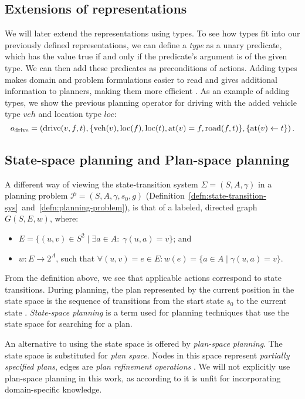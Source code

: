 \subsection{Extensions of representations}

We will later extend the representations using types.
To see how types fit into our previously defined representations, we can
define a \textit{type} as a unary predicate, which has the value true
if and only if the predicate's argument is of the given type.
We can then add these predicates as preconditions of actions.
Adding types makes domain and problem formulations
easier to read and gives additional information
to planners, making them more efficient \citep[Section 2.4.1]{Ghallab2004}. As an example of adding types, we show the previous planning operator for driving with the added vehicle type $veh$ and location type $loc$:
$$o_{\textrm{drive}} = \left(\textrm{drive}(v, f, t), \{\textrm{veh}(v), \textrm{loc}(f), \textrm{loc}(t), \textrm{at}(v) = f, \textrm{road}(f, t)\}, \{\textrm{at}(v) \leftarrow t\}\right).$$

\subsection{State-space planning and Plan-space planning}

A different way of viewing the state-transition system $\Sigma = (S, A, \gamma)$ in a
planning problem $\mathcal{P} = (S, A, \gamma, s_0, g)$ (Definition~\ref{defn:state-transition-sys}~and~\ref{defn:planning-problem}), is that of a labeled, directed graph $G(S, E, w)$, where:
\begin{itemize}
\item $E = \{(u, v) \in S^2 \;|\; \exists a \in A : \; \gamma(u, a) = v\}$; and
\item $w: E \to 2^A$, such that $\forall (u, v) = e \in E : w(e) = \{a \in A \;|\; \gamma(u, a) = v\}$. 
\end{itemize}
From the definition above, we see that applicable actions correspond to state transitions. During planning, the plan represented by the current position in
the state space is the sequence of transitions from the start
state $s_0$ to the current state \citep[Section~4.1]{Ghallab2004}.
\textit{State-space planning} is a term used for planning techniques
that use the state space for searching for a plan.

An alternative to using the state space is offered by \textit{plan-space planning}.
The state space is substituted for \textit{plan space}.
Nodes in this space represent \textit{partially specified plans},
edges are \textit{plan refinement operations} \citep[Section~5.1]{Ghallab2004}.
We will not explicitly use plan-space planning in this work, as according to
\citet[Section~5.6]{Ghallab2004} it is unfit for
incorporating domain-specific knowledge.

